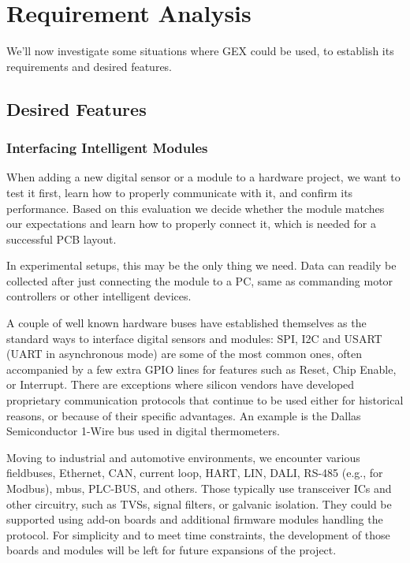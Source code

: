 \chapter{Requirement Analysis}

We'll now investigate some situations where GEX could be used, to establish its requirements and desired features.

\section{Desired Features}

\subsection{Interfacing Intelligent Modules}\label{sec:uses-digital-ifaces}

When adding a new digital sensor or a module to a hardware project, we want to test it first, learn how to properly communicate with it, and confirm its performance. Based on this evaluation we decide whether the module matches our expectations and learn how to properly connect it, which is needed for a successful \gls{PCB} layout.

In experimental setups, this may be the only thing we need. Data can readily be collected after just connecting the module to a \gls{PC}, same as commanding motor controllers or other intelligent devices.

A couple of well known hardware buses have established themselves as the standard ways to interface digital sensors and modules: \gls{SPI}, \gls{I2C} and \gls{USART} (\gls{UART} in asynchronous mode) are some of the most common ones, often accompanied by a few extra \gls{GPIO} lines for features such as Reset, Chip Enable, or Interrupt. There are exceptions where silicon vendors have developed proprietary communication protocols that continue to be used either for historical reasons, or because of their specific advantages. An example is the Dallas Semiconductor 1-Wire bus used in digital thermometers.

Moving to industrial and automotive environments, we encounter various fieldbuses, Ethernet, \gls{CAN}, current loop, \gls{HART}, \gls{LIN}, \gls{DALI}, RS-485 (e.g., for Modbus), \gls{mbus}, PLC-BUS, and others. Those typically use transceiver \glspl{IC} and other circuitry, such as \glspl{TVS}, signal filters, or galvanic isolation. They could be supported using add-on boards and additional firmware modules handling the protocol. For simplicity and to meet time constraints, the development of those boards and modules will be left for future expansions of the project.

